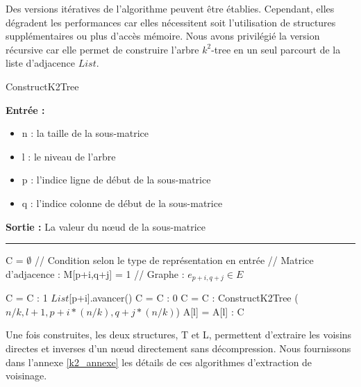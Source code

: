\documentclass[a4paper,oneside,12pt]{report}
\theoremstyle{definition}
\begin{document}
Des versions itératives de l'algorithme peuvent être établies. Cependant, elles dégradent les performances car elles nécessitent soit l'utilisation de structures supplémentaires ou plus d'accès mémoire. Nous avons privilégié la version récursive car elle permet de construire l'arbre $k^2$-tree en un seul parcourt de la liste d'adjacence $List$.\\

					\begin{algorithm}[H]
					\label{alg:k2_tree}
					\caption{ConstructK2Tree}
					\textbf{Entrée :}
						\begin{itemize}[label=$\bullet$]
							\item n : la taille de la sous-matrice
							\item l : le niveau de l'arbre
							\item p : l'indice ligne de début de la sous-matrice
							\item q : l'indice colonne de début de la sous-matrice
						\end{itemize}
					\textbf{Sortie :} La valeur du nœud de la sous-matrice\\							\noindent\rule{\textwidth}{1pt}
						
						
				\begin{algorithmic} [1]
					\STATE C = $ \emptyset$
								\STATE // Condition selon le type de représentation en entrée 
								\STATE // Matrice d'adjacence : M[p+i,q+j] = 1 
								\STATE // Graphe : $e_{p+i,q+j} \in E$
								
									\STATE C = C : 1
									\STATE $List$[p+i].avancer()
								\ELSE
									\STATE C = C : 0
								\ENDIF
							\ELSE
								\STATE  C = C : ConstructK2Tree ( $n/k,l+1,p+i*(n/k), q+j*(n/k)$)
							\ENDIF
						\ENDFOR
					\ENDFOR
					\ENDIF
					\STATE A[l] = A[l] : C
				\end{algorithmic}
			\end{algorithm}
	
	\newpage		
		Une fois construites, les deux structures, T et L, permettent d'extraire les voisins directes et inverses d'un nœud directement sans décompression. Nous fournissons dans l'annexe \ref{k2_annexe} les détails de ces  algorithmes d'extraction de voisinage.		
			
	
\end{document}
